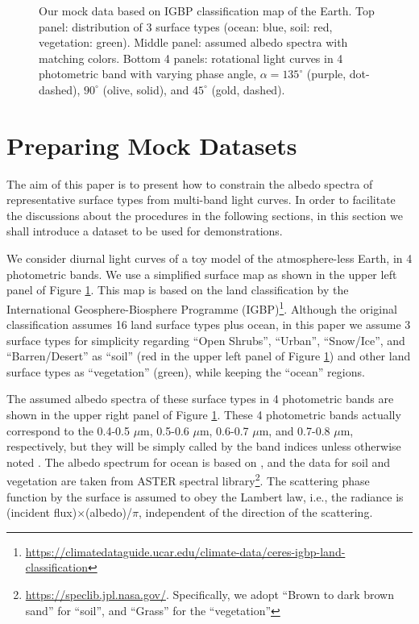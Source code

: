 \documentclass[iop,numberedappendix,apj,]{emulateapj}
\begin{document}
\begin{figure}[t]
\begin{center}
    \end{center}
    \caption{Our mock data based on IGBP classification map of the Earth. Top panel: distribution of 3 surface types (ocean: blue, soil: red, vegetation: green). Middle panel: assumed albedo spectra with matching colors. Bottom 4 panels: rotational light curves in 4 photometric band with varying phase angle, $\alpha = 135^{\circ }$ (purple, dot-dashed), $90^{\circ }$ (olive, solid), and $45^{\circ }$ (gold, dashed). }
\label{fig:mockdata}
\end{figure}


\section{Preparing Mock Datasets}
\label{s:mockdata}

The aim of this paper is to present how to constrain the albedo spectra of representative surface types from multi-band light curves. 
In order to facilitate the discussions about the procedures in the following sections, in this section we shall introduce a dataset to be used for demonstrations. 

We consider diurnal light curves of a toy model of the atmosphere-less Earth, in 4 photometric bands. 
We use a simplified surface map as shown in the upper left panel of Figure \ref{fig:mockdata}. 
This map is based on the land classification by the International Geosphere-Biosphere Programme (IGBP)\footnote{\url{https://climatedataguide.ucar.edu/climate-data/ceres-igbp-land-classification}}. 
Although the original classification assumes 16 land surface types plus ocean, in this paper we assume 3 surface types for simplicity regarding ``Open Shrubs'', ``Urban'', ``Snow/Ice'', and ``Barren/Desert'' as ``soil'' (red in the upper left panel of Figure \ref{fig:mockdata}) and other land surface types as ``vegetation'' (green), while keeping the ``ocean'' regions. 


The assumed albedo spectra of these surface types in 4 photometric bands are shown in the upper right panel of Figure \ref{fig:mockdata}. 
These 4 photometric bands actually correspond to the 0.4-0.5 $\mu $m, 0.5-0.6 $\mu $m, 0.6-0.7 $\mu $m, and 0.7-0.8 $\mu $m, respectively, but they will be simply called by the band indices unless otherwise noted . 
The albedo spectrum for ocean is based on \citet{Mclinden1997}, 
and the data for soil and vegetation are taken from ASTER spectral library\footnote{\url{https://speclib.jpl.nasa.gov/}. 
Specifically, we adopt  ``Brown to dark brown sand'' for ``soil'', and ``Grass'' for the ``vegetation''}. 
The scattering phase function by the surface is assumed to obey the Lambert law, i.e., the radiance is (incident flux)$\times $(albedo)/$\pi$, independent of the direction of the scattering. 
\end{document}
